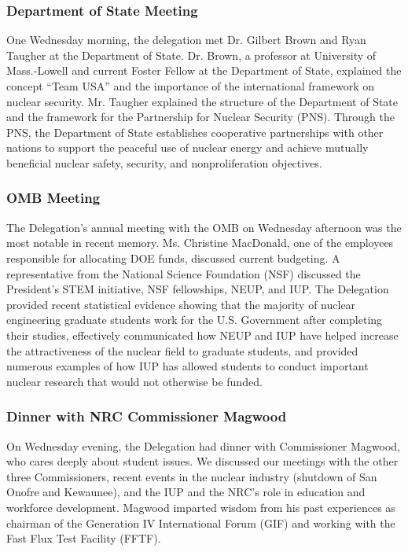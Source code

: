 \subsubsection*{Department of State Meeting}

One Wednesday morning, the delegation met Dr. Gilbert Brown and Ryan Taugher at
the Department of State. Dr. Brown, a professor at University of Mass.-Lowell
and current Foster Fellow at the Department of State, explained the concept
``Team USA'' and the importance of the international framework on nuclear
security. Mr. Taugher explained the structure of the Department of State and the
framework for the Partnership for Nuclear Security (PNS). Through the PNS, the
Department of State establishes cooperative partnerships with other nations to
support the peaceful use of nuclear energy and achieve mutually beneficial
nuclear safety, security, and nonproliferation objectives.
 
\subsubsection*{OMB Meeting}

The Delegation’s annual meeting with the OMB on Wednesday afternoon was the most
notable in recent memory. Ms. Christine MacDonald, one of the employees
responsible for allocating DOE funds, discussed current budgeting. A
representative from the National Science Foundation (NSF) discussed the
President’s STEM initiative, NSF fellowships, NEUP, and IUP. The Delegation
provided recent statistical evidence showing that the majority of nuclear
engineering graduate students work for the U.S. Government after completing
their studies, effectively communicated how NEUP and IUP have helped increase
the attractiveness of the nuclear field to graduate students, and provided
numerous examples of how IUP has allowed students to conduct important nuclear
research that would not otherwise be funded.
 
\subsubsection*{Dinner with NRC Commissioner Magwood}

On Wednesday evening, the Delegation had dinner with Commissioner Magwood, who
cares deeply about student issues. We discussed our meetings with the other
three Commissioners, recent events in the nuclear industry (shutdown of San
Onofre and Kewaunee), and the IUP and the NRC’s role in education and workforce
development. Magwood imparted wisdom from his past experiences as chairman of
the Generation IV International Forum (GIF) and working with the Fast Flux Test
Facility (FFTF).

